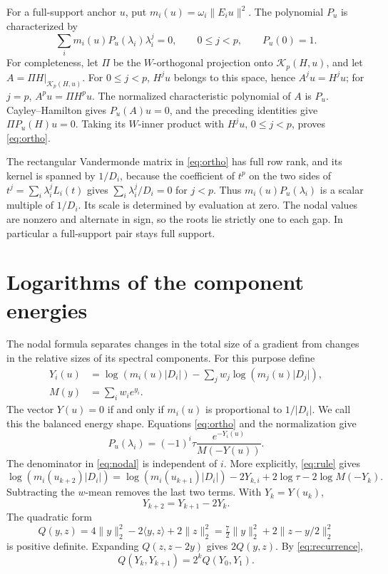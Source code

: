 \documentclass[11pt,a4paper]{article}
\numberwithin{equation}{section}
\newcommand{\abs}[1]{\lvert #1\rvert}
\newcommand{\norm}[1]{\lVert #1\rVert}
\begin{document}
For a full-support anchor \(u\), put \(m_i(u)=\omega_i\norm{E_i u}^2\). The polynomial \(P_u\) is characterized by
\begin{equation}\label{eq:ortho}
   \sum_i m_i(u) P_u(\lambda_i)\lambda_i^j=0,\qquad 0\le j<p,
   \qquad P_u(0)=1 .
\end{equation}
For completeness, let \(\Pi\) be the \(W\)-orthogonal projection
onto \(\mathcal K_p(H,u)\), and let \(A=\Pi H|_{\mathcal K_p(H,u)}\).
For \(0\le j<p\), \(H^ju\) belongs to this space, hence
\(A^ju=H^ju\); for \(j=p\), \(A^pu=\Pi H^pu\).
The normalized characteristic polynomial of \(A\) is \(P_u\).
Cayley--Hamilton gives \(P_u(A)u=0\), and the preceding identities
give \(\Pi P_u(H)u=0\). Taking its \(W\)-inner product with
\(H^ju\), \(0\le j<p\), proves \eqref{eq:ortho}.

The rectangular Vandermonde matrix in \eqref{eq:ortho} has full row rank, and its kernel is spanned by \(1/D_i\), because the coefficient of \(t^p\) on the two sides of \(t^j=\sum_i\lambda_i^jL_i(t)\) gives \(\sum_i \lambda_i^j/D_i=0\) for \(j<p\). Thus \(m_i(u)P_u(\lambda_i)\) is a scalar multiple of \(1/D_i\). Its scale is determined by evaluation at zero. The nodal values are nonzero and alternate in sign, so the roots lie strictly one to each gap. In particular a full-support pair stays full support.

\section{Logarithms of the component energies}\label{sec:coordinates}
The nodal formula separates changes in the total size of a gradient
from changes in the relative sizes of its spectral components.
For this purpose define
\begin{align*}
  Y_i(u)&=\log(m_i(u)\abs{D_i})
         -\sum_j w_j\log(m_j(u)\abs{D_j}),\\
  M(y)&=\sum_i w_i e^{y_i}.
\end{align*}
The vector \(Y(u)=0\) if and only if \(m_i(u)\) is proportional to \(1/\abs{D_i}\). We call this the balanced energy shape. Equations \eqref{eq:ortho} and the normalization give
\begin{equation}\label{eq:nodal}
 P_u(\lambda_i)=(-1)^i \tau\frac{e^{-Y_i(u)}}{M(-Y(u))}.
\end{equation}
The denominator in \eqref{eq:nodal} is independent of \(i\).
More explicitly, \eqref{eq:rule} gives
\[
 \log(m_i(u_{k+2})|D_i|)
 =\log(m_i(u_{k+1})|D_i|)-2Y_{k,i}
   +2\log\tau-2\log M(-Y_k).
\]
Subtracting the \(w\)-mean removes the last two terms. With \(Y_k=Y(u_k)\),
\begin{equation}\label{eq:recurrence}
 Y_{k+2}=Y_{k+1}-2Y_k .
\end{equation}
The quadratic form
\[
 Q(y,z)=4\norm y_2^2-2\langle y,z\rangle+2\norm z_2^2
       =\tfrac72\norm y_2^2+2\norm{z-y/2}_2^2
\]
is positive definite. Expanding \(Q(z,z-2y)\) gives \(2Q(y,z)\). By \eqref{eq:recurrence},
\begin{equation}\label{eq:energy-doubling}
 Q(Y_k,Y_{k+1})=2^kQ(Y_0,Y_1).
\end{equation}
\end{document}
